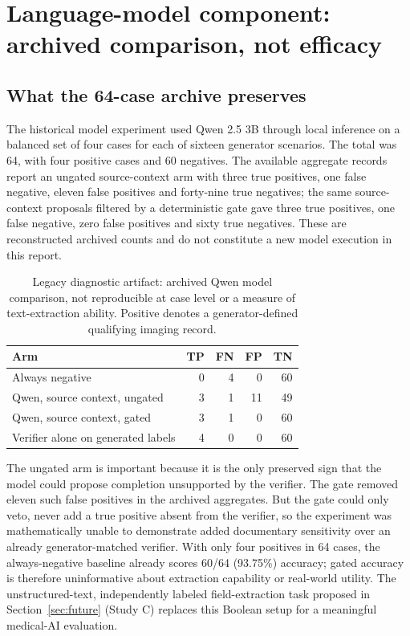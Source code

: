 \documentclass[11pt,twocolumn]{article}
\begin{document}
\section{Language-model component: archived comparison, not efficacy}\label{sec:ai}
\subsection{What the 64-case archive preserves}
The historical model experiment used Qwen 2.5 3B through local inference on a balanced set of four cases for each of sixteen generator scenarios. The total was 64, with four positive cases and 60 negatives. The available aggregate records report an ungated source-context arm with three true positives, one false negative, eleven false positives and forty-nine true negatives; the same source-context proposals filtered by a deterministic gate gave three true positives, one false negative, zero false positives and sixty true negatives. These are reconstructed archived counts and do not constitute a new model execution in this report.

\begin{table}[ht]\centering\scriptsize\caption{Legacy diagnostic artifact: archived Qwen model comparison, not reproducible at case level or a measure of text-extraction ability. Positive denotes a generator-defined qualifying imaging record.}\label{tab:llm}
\begin{tabular}{@{}p{}rrrr@{}}\toprule
Arm & TP & FN & FP & TN \\\midrule
Always negative & 0 & 4 & 0 & 60 \\
Qwen, source context, ungated & 3 & 1 & 11 & 49 \\
Qwen, source context, gated & 3 & 1 & 0 & 60 \\
Verifier alone on generated labels & 4 & 0 & 0 & 60 \\\bottomrule
\end{tabular}
\end{table}

The ungated arm is important because it is the only preserved sign that the model could propose completion unsupported by the verifier. The gate removed eleven such false positives in the archived aggregates. But the gate could only veto, never add a true positive absent from the verifier, so the experiment was mathematically unable to demonstrate added documentary sensitivity over an already generator-matched verifier. With only four positives in 64 cases, the always-negative baseline already scores 60/64 (93.75\%) accuracy; gated accuracy is therefore uninformative about extraction capability or real-world utility. The unstructured-text, independently labeled field-extraction task proposed in Section~\ref{sec:future} (Study C) replaces this Boolean setup for a meaningful medical-AI evaluation.
\end{document}

